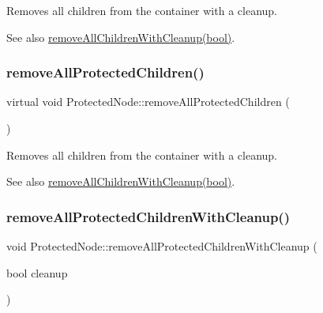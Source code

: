 Removes all children from the container with a cleanup.

\begin{DoxySeeAlso}{See also}
{\ttfamily \hyperlink{classNode_aca66e2b385c3dbf1a6f55627c4a13192}{remove\+All\+Children\+With\+Cleanup(bool)}}. 
\end{DoxySeeAlso}
\mbox{\label{classProtectedNode_a3442f092881a51775ec290a37e003652}} 
\subsubsection{\texorpdfstring{remove\+All\+Protected\+Children()}{removeAllProtectedChildren()}\hspace{0.1cm}{\footnotesize\ttfamily [2/2]}}
{\footnotesize\ttfamily virtual void Protected\+Node\+::remove\+All\+Protected\+Children (\begin{DoxyParamCaption}{ }\end{DoxyParamCaption})\hspace{0.3cm}{\ttfamily [virtual]}}

Removes all children from the container with a cleanup.

\begin{DoxySeeAlso}{See also}
{\ttfamily \hyperlink{classNode_aca66e2b385c3dbf1a6f55627c4a13192}{remove\+All\+Children\+With\+Cleanup(bool)}}. 
\end{DoxySeeAlso}
\mbox{\label{classProtectedNode_a0046f13e110ee0de2d038a85cd3f75c6}} 
\subsubsection{\texorpdfstring{remove\+All\+Protected\+Children\+With\+Cleanup()}{removeAllProtectedChildrenWithCleanup()}\hspace{0.1cm}{\footnotesize\ttfamily [1/2]}}
{\footnotesize\ttfamily void Protected\+Node\+::remove\+All\+Protected\+Children\+With\+Cleanup (\begin{DoxyParamCaption}\item[{bool}]{cleanup }\end{DoxyParamCaption})\hspace{0.3cm}{\ttfamily [virtual]}}

